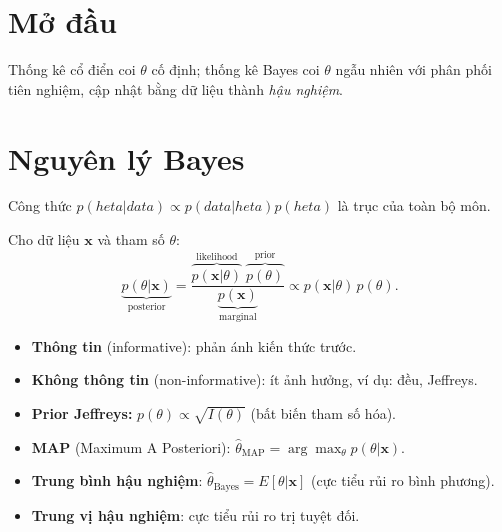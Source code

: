 \documentclass[12pt,a4paper]{article}
\begin{document}

\newpage
\tableofcontents
\newpage



\section{Mở đầu}

\begin{dongco}[title={Động cơ --- Mở đầu}]
Thống kê cổ điển coi $\theta$ cố định; thống kê Bayes coi $\theta$ ngẫu nhiên với phân phối tiên nghiệm, cập nhật bằng dữ liệu thành \emph{hậu nghiệm}.
\end{dongco}

\newpage

\section{Nguyên lý Bayes}

\begin{dongco}[title={Động cơ --- Nguyên lý Bayes}]
Công thức $p(	heta|data) \propto p(data|	heta)p(	heta)$ là trục của toàn bộ môn.
\end{dongco}

\begin{dinhnghia}[title={Suy luận Bayes}]
  Cho dữ liệu $\mathbf{x}$ và tham số $\theta$:
  \[
    \underbrace{p(\theta|\mathbf{x})}_{\text{posterior}} = \frac{\overbrace{p(\mathbf{x}|\theta)}^{\text{likelihood}}\;\overbrace{p(\theta)}^{\text{prior}}}{\underbrace{p(\mathbf{x})}_{\text{marginal}}} \propto p(\mathbf{x}|\theta)\,p(\theta).
  \]
\end{dinhnghia}

\begin{dinhnghia}[title={Prior (phân phối tiên nghiệm)}]
  \begin{itemize}
    \item \textbf{Thông tin} (informative): phản ánh kiến thức trước.
    \item \textbf{Không thông tin} (non-informative): ít ảnh hưởng, ví dụ: đều, Jeffreys.
    \item \textbf{Prior Jeffreys:} $p(\theta) \propto \sqrt{I(\theta)}$ (bất biến tham số hóa).
  \end{itemize}
\end{dinhnghia}

\begin{dinhnghia}[title={Ước lượng Bayes}]
  \begin{itemize}
    \item \textbf{MAP} (Maximum A Posteriori): $\hat{\theta}_{\text{MAP}} = \arg\max_\theta p(\theta|\mathbf{x})$.
    \item \textbf{Trung bình hậu nghiệm}: $\hat{\theta}_{\text{Bayes}} = E[\theta|\mathbf{x}]$ (cực tiểu rủi ro bình phương).
    \item \textbf{Trung vị hậu nghiệm}: cực tiểu rủi ro trị tuyệt đối.
  \end{itemize}
\end{dinhnghia}
\end{document}
